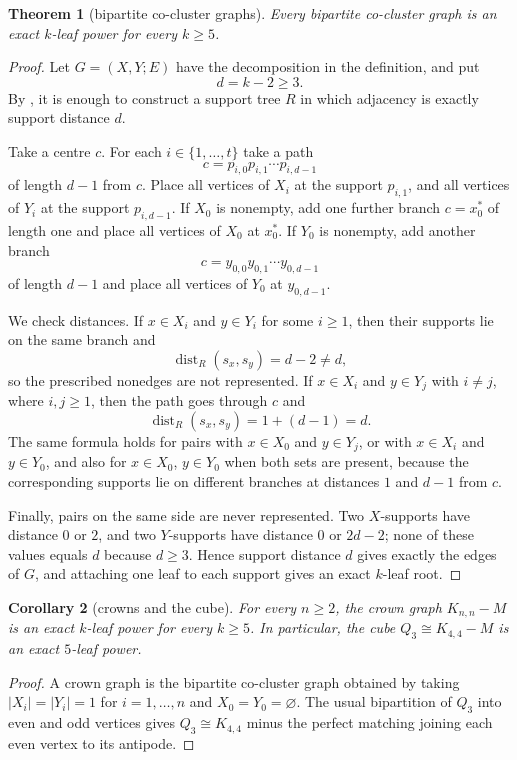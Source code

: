 \documentclass[11pt]{article}
\newtheorem{theorem}{Theorem}[section]
\newtheorem{corollary}[theorem]{Corollary}
\theoremstyle{definition}
\newcommand{\dist}{\operatorname{dist}}
\begin{document}
\begin{theorem}[bipartite co-cluster graphs]\label{thm:cocluster}
Every bipartite co-cluster graph is an exact $k$-leaf power for every $k\ge5$.
\end{theorem}

\begin{proof}
Let $G=(X,Y;E)$ have the decomposition in the definition, and put
\[
 d=k-2\ge3.
\]
By , it is enough to construct a support tree $R$ in which adjacency is exactly support distance $d$.

Take a centre $c$.  For each $i\in\{1,\ldots,t\}$ take a path
\[
 c=p_{i,0}p_{i,1}\cdots p_{i,d-1}
\]
of length $d-1$ from $c$.  Place all vertices of $X_i$ at the support $p_{i,1}$, and all vertices of $Y_i$ at the support $p_{i,d-1}$.  If $X_0$ is nonempty, add one further branch $c=x_0^*$ of length one and place all vertices of $X_0$ at $x_0^*$.  If $Y_0$ is nonempty, add another branch
\[
 c=y_{0,0}y_{0,1}\cdots y_{0,d-1}
\]
of length $d-1$ and place all vertices of $Y_0$ at $y_{0,d-1}$.

We check distances.  If $x\in X_i$ and $y\in Y_i$ for some $i\ge1$, then their supports lie on the same branch and
\[
 \dist_R(s_x,s_y)=d-2\ne d,
\]
so the prescribed nonedges are not represented.  If $x\in X_i$ and $y\in Y_j$ with $i\ne j$, where $i,j\ge1$, then the path goes through $c$ and
\[
 \dist_R(s_x,s_y)=1+(d-1)=d.
\]
The same formula holds for pairs with $x\in X_0$ and $y\in Y_j$, or with $x\in X_i$ and $y\in Y_0$, and also for $x\in X_0$, $y\in Y_0$ when both sets are present, because the corresponding supports lie on different branches at distances $1$ and $d-1$ from $c$.

Finally, pairs on the same side are never represented.  Two $X$-supports have distance $0$ or $2$, and two $Y$-supports have distance $0$ or $2d-2$; none of these values equals $d$ because $d\ge3$.  Hence support distance $d$ gives exactly the edges of $G$, and attaching one leaf to each support gives an exact $k$-leaf root.
\end{proof}

\begin{corollary}[crowns and the cube]\label{cor:crowns-cube}
For every $n\ge2$, the crown graph $K_{n,n}-M$ is an exact $k$-leaf power for every $k\ge5$.  In particular, the cube $Q_3\cong K_{4,4}-M$ is an exact $5$-leaf power.
\end{corollary}

\begin{proof}
A crown graph is the bipartite co-cluster graph obtained by taking $|X_i|=|Y_i|=1$ for $i=1,\ldots,n$ and $X_0=Y_0=\varnothing$.  The usual bipartition of $Q_3$ into even and odd vertices gives $Q_3\cong K_{4,4}$ minus the perfect matching joining each even vertex to its antipode.
\end{proof}
\end{document}
